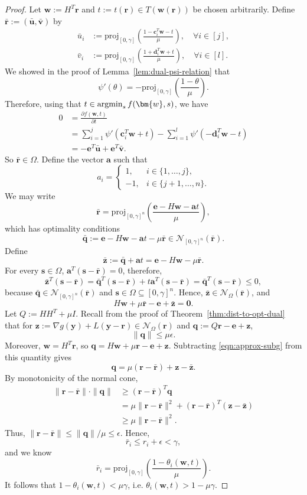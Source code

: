 \documentclass[twoside,11pt]{article}
\newcommand\argmin{\mathop{\rm argmin}}
\newcommand\proj{\mathrm{proj}}
\newcommand\bz{\bm{0}}
\renewcommand{\a}{\bm{a}}
\renewcommand{\c}{\bm{c}}
\renewcommand{\d}{\bm{d}}
\newcommand\q{\bm{q}}
\renewcommand\r{\bm{r}}
\newcommand\s{\bm{s}}
\renewcommand\u{\bm{u}}
\renewcommand\v{\bm{v}}
\newcommand\w{\bm{w}}
\newcommand\y{\bm{y}}
\newcommand\z{\bm{z}}
\newcommand\e{\bm{e}}
\newcommand\mN{\mathcal{N}}
\begin{document}
\begin{proof}
Let $\w := H^T\r$ and $t := t(\r) \in T(\w(\r))$ be chosen arbitrarily. Define $\bar{\r} := (\bar{\u}, \bar{\v})$ by
\begin{align*}
    \bar{u}_i &:= \proj_{[0,\gamma]}\left(\frac{1-\c_i^T\w - t}{\mu}\right),\quad\forall i \in [j],\\
    \bar{v}_i &:= \proj_{[0,\gamma]}\left(\frac{1+\d_i^T\w + t}{\mu}\right),\quad\forall i \in [l].
\end{align*}
We showed in the proof of Lemma~\ref{lem:dual-psi-relation} that
\[
    \psi'(\theta) = -\proj_{[0,\gamma]}\left(\frac{1-\theta}{\mu}\right).
\]
Therefore, using that $t \in \argmin_{s} f(\w,s)$, we have
\begin{align*}
    0 &= \frac{\partial f(\w,t)}{\partial t}\\
      &= \sum_{i=1}^j \psi'(\c_i^T\w + t) - \sum_{i=1}^l \psi'(-\d_i^T\w - t)\\
      &= -\e^T\bar{\u} + \e^T\bar{\v}.
\end{align*}
So $\bar{\r} \in \Omega$. Define the vector $\a$ such that
\[
    a_i = \begin{cases}
        1, & i \in \{1,\hdots,j\},\\
        -1, & i \in \{j+1,\hdots,n\}.
    \end{cases}
\]
We may write
\[
    \bar{\r} = \proj_{[0,\gamma]^n}\left(\frac{\e - H\w - \a t}{\mu}\right),
\]
which has optimality conditions
\[
    \bar{\q} := \e - H\w - \a t - \mu\bar{\r} \in \mN_{[0,\gamma]^n}(\bar{\r}).
\]
Define
\[
    \bar{\z} := \bar{\q} + \a t = \e - H\w - \mu\bar{\r}.
\]
For every $\s \in \Omega$, $\a^T(\s - \bar{\r}) = 0$, therefore,
\[
    \bar{\z}^T(\s - \bar{\r}) = \bar{\q}^T(\s - \bar{\r}) + t\a^T(\s - \bar{\r}) = \bar{\q}^T(\s - \bar{\r}) \leq 0,
\]
because $\bar{\q} \in \mN_{[0,\gamma]^n}(\bar{\r})$ and $\s \in \Omega \subseteq [0,\gamma]^n$. Hence, $\bar{\z} \in \mN_{\Omega}(\bar{\r})$, and
\begin{equation} \label{eqn:approx-subg}
    H\w + \mu\bar{\r} - \e + \bar{\z} = \bz.
\end{equation}
Let $Q := HH^T + \mu I$. Recall from the proof of Theorem~\ref{thm:dist-to-opt-dual} that for $\z := \nabla g(\y) + L(\y - \r) \in \mN_{\Omega}(\r)$ and $\q := Q\r - \e + \z$,
\[
    \|\q\| \leq \mu\epsilon.
\]
Moreover, $\w = H^T\r$, so $\q = H\w + \mu\r - \e + \z$. Subtracting \eqref{eqn:approx-subg} from this quantity gives
\[
    \q = \mu(\r - \bar{\r}) + \z - \bar{\z}.
\]
By monotonicity of the normal cone,
\begin{align*}
\|\r- \bar{\r}\|\cdot\|\q\| &\geq (\r - \bar{\r})^T\q\\
                            &= \mu\|\r - \bar{\r}\|^2 + (\r - \bar{\r})^T(\z - \bar{\z})\\
                            &\geq \mu\|\r - \bar{\r}\|^2.
\end{align*}
Thus, $\|\r - \bar{\r}\| \leq \|\q\|/\mu \leq \epsilon$. Hence,
\[
    \bar{r}_i \leq r_i + \epsilon < \gamma,
\]
and we know
\[
    \bar{r}_i = \proj_{[0,\gamma]}\left(\frac{1-\theta_i(\w,t)}{\mu}\right).
\]
It follows that $1 - \theta_i(\w,t) < \mu\gamma$, i.e. $\theta_i(\w,t) > 1 - \mu\gamma$.


\end{proof}
\end{document}
